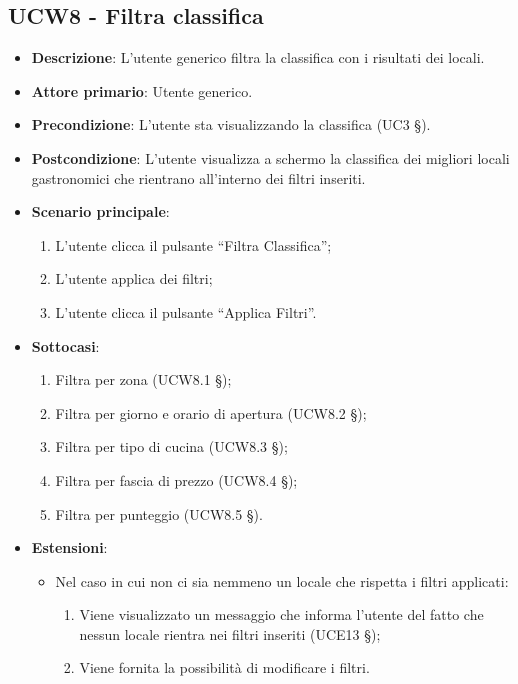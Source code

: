\subsection{UCW8 - Filtra classifica}

\begin{itemize}
	\item \textbf{Descrizione}: L'utente generico filtra la classifica con i risultati dei locali.
    \item \textbf{Attore primario}: Utente generico.
    \item \textbf{Precondizione}: L’utente sta visualizzando la classifica (UC3 §).
    \item \textbf{Postcondizione}: L’utente visualizza a schermo la classifica dei migliori locali gastronomici che rientrano all’interno dei filtri inseriti.
    \item \textbf{Scenario principale}: 
    \begin{enumerate}
        \item L’utente clicca il pulsante “Filtra Classifica”;
        \item L’utente applica dei filtri;
        \item L’utente clicca il pulsante “Applica Filtri”.
    \end{enumerate}

    \item \textbf{Sottocasi}:
    \begin{enumerate}
        \item Filtra per zona (UCW8.1 §);
        \item Filtra per giorno e orario di apertura (UCW8.2 §);
        \item Filtra per tipo di cucina (UCW8.3 §);
        \item Filtra per fascia di prezzo (UCW8.4 §);
        \item Filtra per punteggio (UCW8.5 §).
    \end{enumerate}

    \item \textbf{Estensioni}:
    \begin{itemize}
        \item Nel caso in cui non ci sia nemmeno un locale che rispetta i filtri applicati:
        \begin{enumerate}
            \item Viene visualizzato un messaggio che informa l’utente del fatto che nessun locale rientra nei filtri inseriti (UCE13 §);
            \item Viene fornita la possibilità di modificare i filtri.
        \end{enumerate}
    \end{itemize}
\end{itemize}

